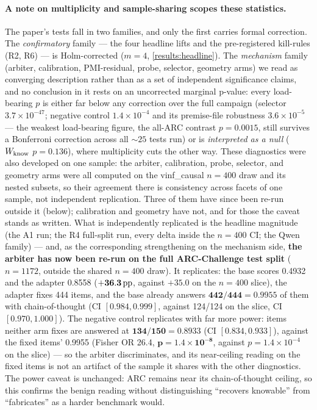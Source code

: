 \paragraph{A note on multiplicity and sample-sharing scopes these statistics.}
The paper's tests fall in two families, and only the first carries formal
correction. The \emph{confirmatory} family --- the four headline lifts and the
pre-registered kill-rules (R2, R6) --- is Holm-corrected ($m{=}4$,
\cref{results:headline}). The \emph{mechanism} family (arbiter, calibration,
PMI-residual, probe, selector, geometry arms) we read as converging description
rather than as a set of independent significance claims, and no conclusion in it
rests on an uncorrected marginal p-value: every load-bearing $p$ is either far
below any correction over the full campaign (selector $3.7\times10^{-47}$;
negative control $1.4\times10^{-4}$ and its premise-file robustness
$3.6\times10^{-5}$ --- the weakest load-bearing figure, the all-ARC contrast
$p=0.0015$, still survives a Bonferroni correction across all ${\sim}25$ tests run)
or is \emph{interpreted as a null} ($W_{\mathrm{know}}$ $p=0.136$), where multiplicity cuts
the other way. These diagnostics were also developed on one sample: the arbiter, calibration,
probe, selector, and geometry arms were all computed on the vinf\_causal $n{=}400$
draw and its nested subsets, so their agreement there is consistency across facets of
one sample, not independent replication. Three of them have since been re-run outside
it (below); calibration and geometry have not, and for those the caveat stands as
written. What is independently replicated is the
headline magnitude (the A1 run; the R4 full-split run, every delta inside the
$n{=}400$ CI; the Qwen family) --- and, as the corresponding strengthening on the
mechanism side, \textbf{the arbiter has now been re-run on the full ARC-Challenge
test split} ($n{=}1172$, outside the shared $n{=}400$ draw). It replicates: the
base scores 0.4932 and the adapter 0.8558 ($\mathbf{+36.3\,\mathrm{pp}}$, against $+35.0$ on
the $n{=}400$ slice), the adapter fixes 444 items, and the base already answers
$\mathbf{442/444 = 0.9955}$ of them with chain-of-thought (CI $[0.984, 0.999]$,
against 124/124 on the slice, CI $[0.970, 1.000]$). The negative control replicates
with far more power: items neither arm fixes are answered at
$\mathbf{134/150 = 0.8933}$ (CI $[0.834, 0.933]$), against the fixed items' 0.9955
(Fisher OR 26.4, $\mathbf{p = 1.4\times10^{-8}}$, against $p = 1.4\times10^{-4}$ on
the slice) --- so the arbiter discriminates, and its near-ceiling reading on the
fixed items is not an artifact of the sample it shares with the other diagnostics.
The power caveat is unchanged: ARC remains near its chain-of-thought ceiling, so
this confirms the benign reading without distinguishing ``recovers knowable'' from
``fabricates'' as a harder benchmark would.

